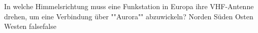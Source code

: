     {In welche Himmelsrichtung muss eine Funkstation in Europa ihre VHF-Antenne drehen, um eine Verbindung über ""Aurora"" abzuwickeln?}
    {Norden}
    {Süden}
    {Osten}
    {Westen}
    {false}{false}